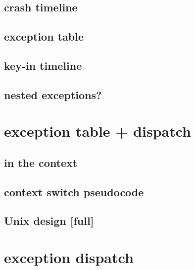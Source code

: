 \subsection{crash timeline}


\subsection{exception table}


\subsection{key-in timeline}


\subsection{nested exceptions?}


\section{exception table + dispatch}


\subsection{in the context}


\subsection{context switch pseudocode}


\subsection{Unix design [full]}


\section{exception dispatch}


